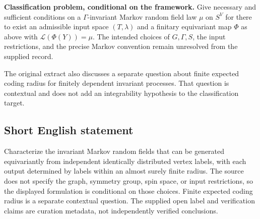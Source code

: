 \documentclass[11pt]{article}
\begin{document}
\textbf{Classification problem, conditional on the framework.} Give necessary and sufficient conditions on a \(\Gamma\)-invariant Markov random field law \(\mu\) on \(S^V\) for there to exist an admissible input space \((T,\lambda)\) and a finitary equivariant map \(\Phi\) as above with \(\mathcal L(\Phi(Y))=\mu\). The intended choices of \(G,\Gamma,S\), the input restrictions, and the precise Markov convention remain unresolved from the supplied record.

The original extract also discusses a separate question about finite expected coding radius for finitely dependent invariant processes. That question is contextual and does not add an integrability hypothesis to the classification target.
\subsection{Short English statement}
Characterize the invariant Markov random fields that can be generated equivariantly from independent identically distributed vertex labels, with each output determined by labels within an almost surely finite radius. The source does not specify the graph, symmetry group, spin space, or input restrictions, so the displayed formulation is conditional on those choices. Finite expected coding radius is a separate contextual question. The supplied open label and verification claims are curation metadata, not independently verified conclusions.
\end{document}
